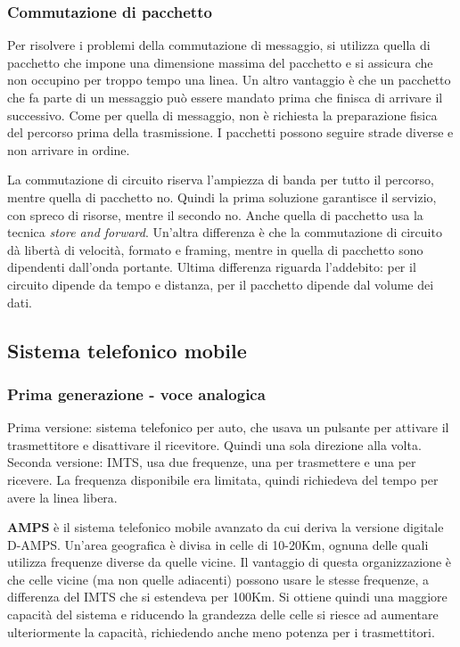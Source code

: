 \subsubsection{Commutazione di pacchetto}
Per risolvere i problemi della commutazione di messaggio, si utilizza quella di pacchetto che impone una dimensione massima del pacchetto e si assicura che non occupino per troppo tempo una linea.
Un altro vantaggio è che un pacchetto che fa parte di un messaggio può essere mandato prima che finisca di arrivare il successivo.
Come per quella di messaggio, non è richiesta la preparazione fisica del percorso prima della trasmissione.
I pacchetti possono seguire strade diverse e non arrivare in ordine.

La commutazione di circuito riserva l'ampiezza di banda per tutto il percorso, mentre quella di pacchetto no.
Quindi la prima soluzione garantisce il servizio, con spreco di risorse, mentre il secondo no.
Anche quella di pacchetto usa la tecnica \textit{store and forward}. 
Un'altra differenza è che la commutazione di circuito dà libertà di velocità, formato e framing, mentre in quella di pacchetto sono dipendenti dall'onda portante.
Ultima differenza riguarda l'addebito: per il circuito dipende da tempo e distanza, per il pacchetto dipende dal volume dei dati.

\subsection{Sistema telefonico mobile}

\subsubsection{Prima generazione - voce analogica}
Prima versione: sistema telefonico per auto, che usava un pulsante per attivare il trasmettitore e disattivare il ricevitore. Quindi una sola direzione alla volta.\\
Seconda versione: IMTS, usa due frequenze, una per trasmettere e una per ricevere. La frequenza disponibile era limitata, quindi richiedeva del tempo per avere la linea libera.

\textbf{AMPS} è il sistema telefonico mobile avanzato da cui deriva la versione digitale D-AMPS.
Un'area geografica è divisa in celle di 10-20Km, ognuna delle quali utilizza frequenze diverse da quelle vicine.
Il vantaggio di questa organizzazione è che celle vicine (ma non quelle adiacenti) possono usare le stesse frequenze, a differenza del IMTS che si estendeva per 100Km.
Si ottiene quindi una maggiore capacità del sistema e riducendo la grandezza delle celle si riesce ad aumentare ulteriormente la capacità, richiedendo anche meno potenza per i trasmettitori.


